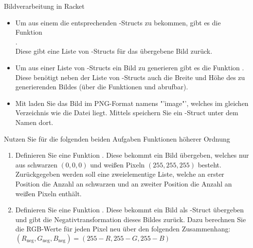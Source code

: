 \documentclass{../tuda-exercise}
\begin{document}
\begin{task}[credit=\stars{3}{3}]{Bildverarbeitung in Racket}
    \begin{itemize}
      \item Um aus einem  die entsprechenden -Structs zu
      bekommen, gibt es die Funktion
      \\
      .
      \\
      Diese gibt eine Liste von -Structs für das übergebene Bild zurück.
      \item Um aus einer Liste von -Structs ein Bild zu generieren gibt es
      die Funktion
      . Diese benötigt neben der Liste von
      -Structs auch die Breite und Höhe des zu generierenden Bildes (über die
      Funktionen  und  abrufbar).
      \item Mit  laden Sie das Bild im
      PNG-Format namens \textcolor{stringcolor}{"'image"'}, welches im gleichen Verzeichnis wie
      die  Datei liegt. Mittels  speichern
      Sie ein -Struct unter dem Namen \code{\textcolor{stringcolor}{"'out"'}}
      dort.
    \end{itemize}

    Nutzen Sie für die folgenden beiden Aufgaben Funktionen höherer Ordnung

    \begin{enumerate}
      \item Definieren Sie eine Funktion . Diese bekommt
      ein Bild übergeben, welches nur aus schwarzen \((0,0,0)\) und weißen Pixeln \((255,255,255)\)
      besteht. Zurückgegeben werden soll eine zweielementige Liste, welche an erster Position
      die Anzahl an schwarzen und an zweiter Position die Anzahl an weißen Pixeln enthält.
      \item Definieren Sie eine Funktion . Diese
      bekommt ein Bild als -Struct übergeben und gibt die
      Negativtransformation dieses Bildes zurück. Dazu berechnen Sie die RGB-Werte für jeden
      Pixel neu über den folgenden Zusammenhang:
      \((R_{\text{neg}}, G_{\text{neg}}, B_{\text{neg}}) = (255 - R, 255 - G, 255 - B)\)
    \end{enumerate}

    \clearpagesolution

    \begin{solution}
      
    \end{solution}
  \end{task}
\end{document}
